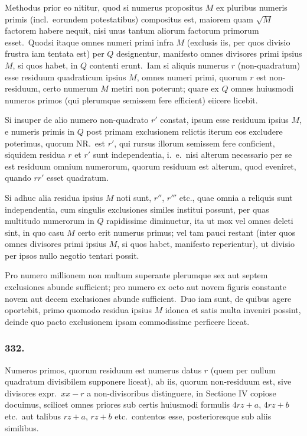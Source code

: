 \documentclass[12pt,a4paper]{article}
\theoremstyle{plain}
\theoremstyle{definition}
\theoremstyle{remark}
\begin{document}
Methodus prior eo nititur, quod si numerus propositus $M$ ex pluribus
numeris primis (incl.\ eorundem potestatibus) compositus est, maiorem quam
$\sqrt{M}$ factorem habere nequit, nisi unus tantum aliorum factorum primorum
esset.\ Quodsi itaque omnes numeri primi infra $M$ (exclusis iis, per quos
divisio frustra iam tentata est) per $Q$ designentur, manifesto omnes divisores
primi ipsius $M$, si quos habet, in $Q$ contenti erunt.\ Iam si aliquis numerus
$r$ (non-quadratum) esse residuum quadraticum ipsius $M$, omnes numeri
primi, quorum $r$ est non-residuum, certo numerum $M$ metiri non poterunt;
quare ex $Q$ omnes huiusmodi numeros primos (qui plerumque semissem fere
efficient) eiicere licebit.

Si insuper de alio numero non-quadrato $r'$ constat, ipsum esse residuum
ipsius $M$, e numeris primis in $Q$ post primam exclusionem relictis iterum
eos excludere poterimus, quorum NR.\ est $r'$, qui rursus illorum semissem fere
conficient, siquidem residua $r$ et $r'$ sunt independentia, i.\ e.\ nisi alterum
necessario per se est residuum omnium numerorum, quorum residuum est
alterum, quod eveniret, quando $rr'$ esset quadratum.

Si adhuc alia residua ipsius $M$ noti sunt, $r''$, $r'''$ etc., quae omnia a
reliquis sunt independentia, cum singulis exclusiones similes institui possunt,
per quas multitudo numerorum in $Q$ rapidissime diminuetur, ita ut mox vel
omnes deleti sint, in quo casu $M$ certo erit numerus primus; vel tam pauci
restant (inter quos omnes divisores primi ipsius $M$, si quos habet, manifesto
reperientur), ut divisio per ipsos nullo negotio tentari possit.

Pro numero millionem non multum superante plerumque sex aut septem
exclusiones abunde sufficient; pro numero ex octo aut novem figuris
constante novem aut decem exclusiones abunde sufficient.\ Duo iam sunt,
de quibus agere oportebit, primo quomodo residua ipsius $M$ idonea et satis
multa inveniri possint, deinde quo pacto exclusionem ipsam commodissime
perficere liceat.

\subsubsection*{332.}

Numeros primos, quorum residuum est numerus datus $r$ (quem per
nullum quadratum divisibilem supponere liceat), ab iis, quorum non-residuum
est, sive divisores expr.\ $xx-r$ a non-divisoribus distinguere, in Sectione IV
copiose docuimus, scilicet omnes priores sub certis huiusmodi formulis
$4rz+a$, $4rz+b$ etc.\ aut talibus $rz+a$, $rz+b$ etc.\ contentos esse,
posterioresque sub aliis similibus.
\end{document}

